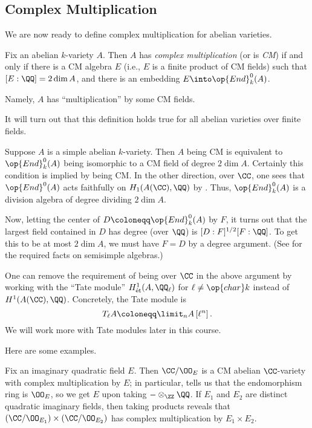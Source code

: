 \documentclass[../notes.tex]{subfiles}
\begin{document}
\subsection{Complex Multiplication}
We are now ready to define complex multiplication for abelian varieties.
\begin{definition}
	Fix an abelian $k$-variety $A$. Then $A$ has \textit{complex multiplication} (or is \textit{CM}) if and only if there is a CM algebra $E$ (i.e., $E$ is a finite product of CM fields) such that $[E:\QQ]=2\dim A$, and there is an embedding $E\into\op{End}^0_k(A)$.
\end{definition}
Namely, $A$ has ``multiplication'' by some CM fields.
\begin{remark}
	It will turn out that this definition holds true for all abelian varieties over finite fields.
\end{remark}
\begin{remark}
	Suppose $A$ is a simple abelian $k$-variety. Then $A$ being CM is equivalent to $\op{End}^0_k(A)$ being isomorphic to a CM field of degree $2\dim A$. Certainly this condition is implied by being CM. In the other direction, over $\CC$, one sees that $\op{End}^0(A)$ acts faithfully on $H_1(A(\CC),\QQ)$ by . Thus, $\op{End}^0_k(A)$ is a division algebra of degree dividing $2\dim A$.
	
	Now, letting the center of $D\coloneqq\op{End}^0_k(A)$ by $F$, it turns out that the largest field contained in $D$ has degree (over $\QQ$) is $[D:F]^{1/2}[F:\QQ]$. To get this to be at most $2\dim A$, we must have $F=D$ by a degree argument. (See \cite[Section~I.1]{milne-cm} for the required facts on semisimple algebras.)
\end{remark}
\begin{remark}
	One can remove the requirement of being over $\CC$ in the above argument by working with the ``Tate module'' $H^1_{\text{\'et}}(A,\QQ_\ell)$ for $\ell\ne\op{char}k$ instead of $H^1(A(\CC),\QQ)$. Concretely, the Tate module is
	\[T_\ell A\coloneqq\limit_n A\left[\ell^n\right].\]
	We will work more with Tate modules later in this course.
\end{remark}
Here are some examples.
\begin{example}
	Fix an imaginary quadratic field $E$. Then $\CC/\OO_E$ is a CM abelian $\CC$-variety with complex multiplication by $E$; in particular,  tells us that the endomorphism ring is $\OO_E$, so we get $E$ upon taking $-\otimes_\ZZ\QQ$. If $E_1$ and $E_2$ are distinct quadratic imaginary fields, then taking products reveals that $(\CC/\OO_{E_1})\times(\CC/\OO_{E_2})$ has complex multiplication by $E_1\times E_2$.
\end{example}
\end{document}
